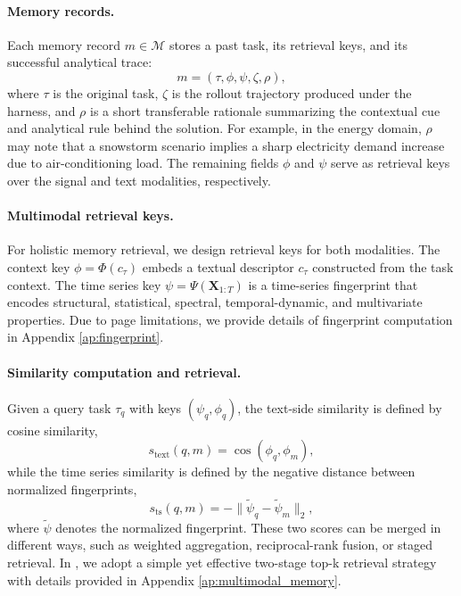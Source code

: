 \paragraph{Memory records.}
Each memory record $m\in\mathcal{M}$ stores a past task, its retrieval keys, and its successful analytical trace:
\begin{equation}
    m = (\tau, \phi, \psi, \zeta, \rho),
\end{equation}
where $\tau$ is the original task, $\zeta$ is the rollout trajectory produced under the harness, and $\rho$ is a short transferable rationale summarizing the contextual cue and analytical rule behind the solution. For example, in the energy domain, $\rho$ may note that a snowstorm scenario implies a sharp electricity demand increase due to air-conditioning load. The remaining fields $\phi$ and $\psi$ serve as retrieval keys over the signal and text modalities, respectively.


\paragraph{Multimodal retrieval keys.}
For holistic memory retrieval, we design retrieval keys for both modalities. The context key $\phi=\Phi(c_\tau)$ embeds a textual descriptor $c_\tau$ constructed from the task context. The time series key $\psi=\Psi(\mathbf{X}_{1:T})$ is a time-series fingerprint that encodes structural, statistical, spectral, temporal-dynamic, and multivariate properties. 
Due to page limitations, we provide details of fingerprint computation in Appendix \ref{ap:fingerprint}.


\paragraph{Similarity computation and retrieval.}
Given a query task $\tau_q$ with keys $(\psi_q,\phi_q)$, the text-side similarity is defined by cosine similarity,
\begin{equation}
    s_{\mathrm{text}}(q,m)=\cos(\phi_q,\phi_m),
\end{equation}
while the time series similarity is defined by the negative distance between normalized fingerprints,
\begin{equation}
    s_{\mathrm{ts}}(q,m)=-\|\tilde{\psi}_q-\tilde{\psi}_m\|_2,
\end{equation}
where $\tilde{\psi}$ denotes the normalized fingerprint. These two scores can be merged in different ways, such as weighted aggregation, reciprocal-rank fusion, or staged retrieval. In \method, we adopt a simple yet effective two-stage top-k retrieval strategy with details provided in Appendix \ref{ap:multimodal_memory}.